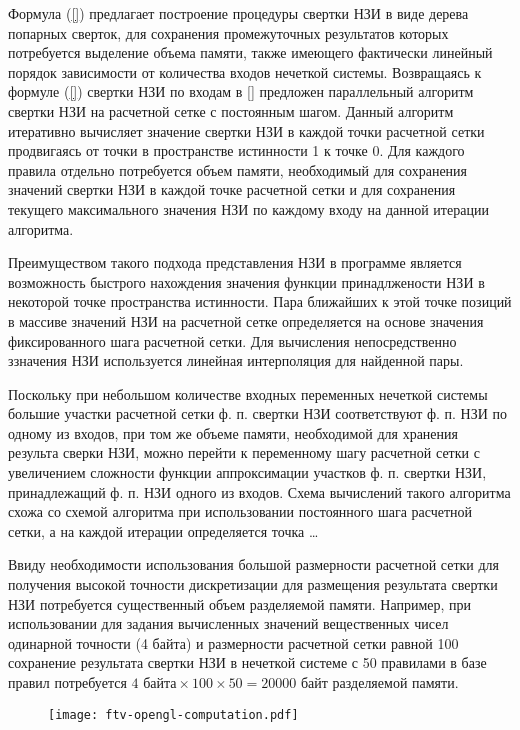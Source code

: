 Формула (\ref{}) предлагает построение процедуры свертки НЗИ в виде дерева попарных сверток, для сохранения промежуточных результатов которых потребуется выделение объема памяти, также имеющего фактически линейный порядок зависимости от количества входов нечеткой системы. Возвращаясь к формуле (\ref{}) свертки НЗИ по входам в [] предложен параллельный алгоритм свертки НЗИ на расчетной сетке с постоянным шагом. Данный алгоритм итеративно вычисляет значение свертки НЗИ в каждой точки расчетной сетки продвигаясь от точки в пространстве истинности 1 к точке 0. Для каждого правила отдельно потребуется объем памяти, необходимый для сохранения значений свертки НЗИ в каждой точке расчетной сетки и для сохранения текущего максимального значения НЗИ по каждому входу на данной итерации алгоритма.

Преимуществом такого подхода представления НЗИ в программе является возможность быстрого нахождения значения функции принадлжености НЗИ в некоторой точке пространства истинности. Пара ближайших к этой точке позиций в массиве значений НЗИ на расчетной сетке определяется на основе значения фиксированного шага расчетной сетки. Для вычисления непосредственно ззначения НЗИ используется линейная интерполяция для найденной пары.

Поскольку при небольшом количестве входных переменных нечеткой системы большие участки расчетной сетки ф. п. свертки НЗИ соответствуют ф. п. НЗИ по одному из входов, при том же объеме памяти, необходимой для хранения результа сверки НЗИ, можно перейти к переменному шагу расчетной сетки с увеличением сложности функции аппроксимации участков ф. п. свертки НЗИ, принадлежащий ф. п. НЗИ одного из входов. Схема вычислений такого алгоритма схожа со схемой алгоритма при использовании постоянного шага расчетной сетки, а на каждой итерации определяется точка \dots

Ввиду необходимости использования большой размерности расчетной сетки для получения высокой точности дискретизации для размещения результата свертки НЗИ потребуется существенный объем разделяемой памяти. Например, при использовании для задания вычисленных значений вещественных чисел одинарной точности (4 байта) и размерности расчетной сетки равной 100 сохранение результата свертки НЗИ в нечеткой системе с 50 правилами в базе правил потребуется $4\textrm{ байта}\times 100 \times 50 = 20000\textrm{ байт}$ разделяемой памяти.

\begin{figure}[hbt]
	\centering
   	\texttt{[image: ftv-opengl-computation.pdf]}
	\label{ftv-opengl-computation}
\end{figure}

